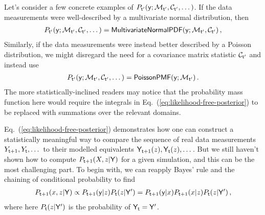 Let's consider a few concrete examples of $P_{{\sf t}'}({\sf y};{\cal M}_{{\sf t}'},{\cal C}_{{\sf t}'}, \dots )$. If the data measurements were well-described by a multivariate normal distribution, then
\begin{align}
P_{{\sf t}'}({\sf y};{\cal M}_{{\sf t}'},{\cal C}_{{\sf t}'}, \dots ) = {\sf MultivariateNormalPDF}({\sf y};{\cal M}_{{\sf t}'},{\cal C}_{{\sf t}'})\,,
\end{align}
Similarly, if the data measurements were instead better described by a Poisson distribution, we might disregard the need for a covariance matrix statistic ${\cal C}_{{\sf t}'}$ and instead use
\begin{align}
P_{{\sf t}'}({\sf y};{\cal M}_{{\sf t}'},{\cal C}_{{\sf t}'}, \dots ) = {\sf PoissonPMF}({\sf y};{\cal M}_{{\sf t}'})\,.
\end{align}
The more statistically-inclined readers may notice that the probability mass function here would require the integrals in Eq.~(\ref{eq:likelihood-free-posterior}) to be replaced with summations over the relevant domains.

Eq.~(\ref{eq:likelihood-free-posterior}) demonstrates how one can construct a statistically meaningful way to compare the sequence of real data measurements $Y_{{\sf t}+1}, Y_{{\sf t}}, \dots$ to their modelled equivalents ${\sf Y}_{{\sf t}+1}(z), {\sf Y}_{{\sf t}}(z), \dots$. But we still haven't shown how to compute $P_{{\sf t}+1}(X,z\vert {\sf Y})$ for a given simulation, and this can be the most challenging part. To begin with, we can reapply Bayes' rule and the chaining of conditional probability to find 
\begin{align}
P_{{\sf t}+1}(x,z\vert {\sf Y}) \propto P_{{\sf t}+1}({\sf y}\vert z)P_{{\sf t}}(z\vert {\sf Y}') = P_{{\sf t}+1}({\sf y}\vert x)P_{{\sf t}+1}(x\vert z)P_{{\sf t}}(z\vert {\sf Y}') \,,
\end{align}
where here $P_{{\sf t}}(z\vert {\sf Y}')$ is the probability of ${\sf Y}_{{\sf t}}={\sf Y}'$.

